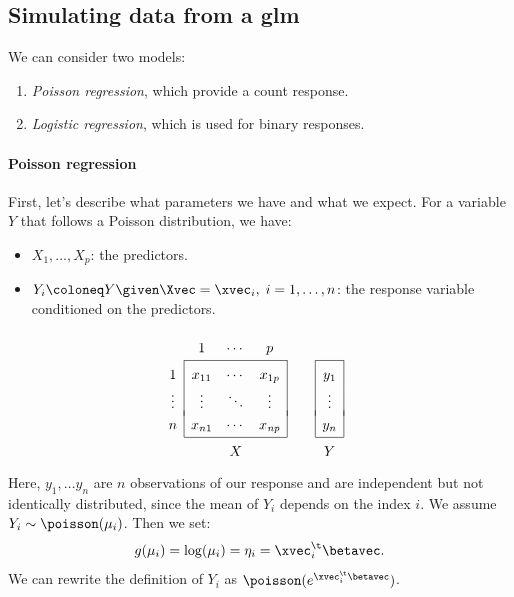 \subsection{Simulating data from a \acs{glm}}

We can consider two models:
\begin{enumerate}
    \item \emph{Poisson regression}, which provide a count response.
    \item \emph{Logistic regression}, which is used for binary responses.
\end{enumerate}

\paragraph{Poisson regression}

First, let's describe what parameters we have and what we expect. For a variable $Y$ that follows a Poisson distribution, we have:
\begin{itemize}
    \item $X_1, \dots, X_p$: the predictors.
    \item $Y_i \coloneq Y \given \Xvec = \xvec_i,\; i = 1, \dots, n$: the response variable conditioned on the predictors.
\end{itemize}
\begin{equation}
    {\renewcommand\arraystretch{1.6}
        \begin{array}{c|ccc|cc|c|c}
            \multicolumn{1}{c}{}                         & 1      & \cdots & \multicolumn{1}{c}{p} &                      & \multicolumn{1}{c}{} & \multicolumn{1}{c}{}  & \\
            \cline{2-4} \cline{7-7}
            1                                            & x_{11} & \cdots & x_{1p}                &                      &                      & y_1                   & \\
            \vdots                                       & \vdots & \ddots & \vdots                &                      &                      & \vdots                & \\[-4pt]
            n                                            & x_{n1} & \cdots & x_{\mathit{np}}                &                      &                      & y_n                   & \\
            \cline{2-4} \cline{7-7} \multicolumn{1}{c}{} &        & X      & \multicolumn{1}{c}{}  & \multicolumn{1}{c}{} & \multicolumn{1}{c}{} & \multicolumn{1}{c}{Y}
        \end{array}
    }
\end{equation}
Here, $y_1, \ldots y_n$ are $n$ observations of our response and are independent but not identically distributed, since the mean of $Y_i$ depends on the index $i$. We assume $Y_i \sim \poisson(\mu_i)$. Then we set:
\begin{equation}
    g(\mu_i) = \log(\mu_i) = \eta_i = \xvec_i^\t\betavec.
\end{equation}
We can rewrite the definition of $Y_i$ as $\poisson(e^{\xvec_i^\t\betavec})$.

